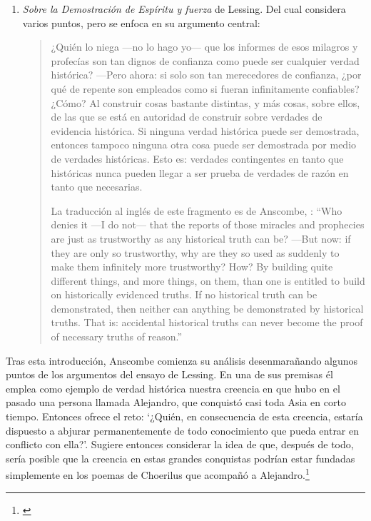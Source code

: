 \begin{enumerate}
\item \emph{Sobre la Demostración de Espíritu y fuerza} de Lessing. Del cual considera varios puntos, pero se enfoca en su argumento central: \blockquote[La traducción al inglés de este fragmento es de Anscombe, {\cite[Cf.~][22]{anscombe2008faith:prophandmi}}: \enquote{Who denies it ---I do not--- that the reports of those miracles and prophecies are just as trustworthy as any historical truth can be? ---But now: if they are only so trustworthy, why are they so used as suddenly to make them infinitely more trustworthy? How? By building quite different things, and more things, on them, than one is entitled to build on historically evidenced truths. If no historical truth can be demonstrated, then neither can anything be demonstrated by historical truths. That is: accidental historical truths can never become the proof of necessary truths of reason.}]{¿Quién lo niega ---no lo hago yo--- que los informes de esos milagros y profecías son tan dignos de confianza como puede ser cualquier verdad histórica? ---Pero ahora: si solo son tan merecedores de confianza, ¿por qué de repente son empleados como si fueran infinitamente confiables? ¿Cómo? Al construir cosas bastante distintas, y más cosas, sobre ellos, de las que se está en autoridad de construir sobre verdades de evidencia histórica. Si ninguna verdad histórica puede ser demostrada, entonces tampoco ninguna otra cosa puede ser demostrada por medio de verdades históricas. Esto es: verdades contingentes en tanto que históricas nunca pueden llegar a ser prueba de verdades de razón en tanto que necesarias.}
\end{enumerate}

Tras esta introducción, Anscombe comienza su análisis desenmarañando algunos puntos de los argumentos del ensayo de Lessing. En una de sus premisas él emplea como ejemplo de verdad histórica nuestra creencia en que hubo en el pasado una persona llamada Alejandro, que conquistó casi toda Asia en corto tiempo. Entonces ofrece el reto: \enquote*{¿Quién, en consecuencia de esta creencia, estaría dispuesto a abjurar permanentemente de todo conocimiento que pueda entrar en conflicto con ella?}. Sugiere entonces considerar la idea de que, después de todo, sería posible que la creencia en estas grandes conquistas podrían estar fundadas simplemente en los poemas de Choerilus que acompañó a Alejandro.\footnote{\cite[Cf.~][448]{lessing1982escritos:demo}}

